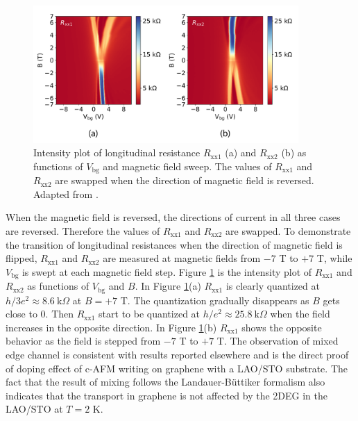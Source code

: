\documentclass[pdflatex, sectionletters, 12pt, final, phd]{pittetd}    %
\begin{document}
\begin{figure}[h!]
	\centering
	\includegraphics[width=0.90\textwidth]{Drawing/MixingIntensityPlot.pdf}
	\caption[Intensity plot of longitudinal resistances]{Intensity plot of longitudinal resistance $R_\mathrm{xx1}$ (a) and $R_\mathrm{xx2}$ (b) as functions of $V_\mathrm{bg}$ and magnetic field sweep. The values of $R_\mathrm{xx1}$ and $R_\mathrm{xx2}$ are swapped when the direction of magnetic field is reversed. Adapted from \cite{li2019reconfigurable}.}
	\label{FIG:MixingIntensityPlot}
\end{figure}

When the magnetic field is reversed, the directions of current in all three cases are reversed. Therefore the values of $R_\mathrm{xx1}$ and $R_\mathrm{xx2}$ are swapped. To demonstrate the transition of longitudinal resistances when the direction of magnetic field is flipped, $R_\mathrm{xx1}$ and $R_\mathrm{xx2}$ are measured at magnetic fields from $-7$ T to $+7$ T, while $V_\mathrm{bg}$ is swept at each magnetic field step. Figure \ref{FIG:MixingIntensityPlot} is the intensity plot of $R_\mathrm{xx1}$ and $R_\mathrm{xx2}$ as functions of $V_\mathrm{bg}$ and $B$. In Figure \ref{FIG:MixingIntensityPlot}(a) $R_\mathrm{xx1}$ is clearly quantized at $h/3e^2 \approx 8.6 \ \mathrm{k}\Omega$ at $B = +7$ T. The quantization gradually disappears as $B$ gets close to 0. Then $R_\mathrm{xx1}$ start to be quantized at $h/e^2 \approx 25.8 \ \mathrm{k}\Omega$ when the field increases in the opposite direction. In Figure \ref{FIG:MixingIntensityPlot}(b) $R_\mathrm{xx1}$ shows the opposite behavior as the field is stepped from $-7$ T to $+7$ T. The observation of mixed edge channel is consistent with results reported elsewhere\cite{williams2007quantum, lohmann2009four, amet2014selective, abanin2007quantized, ki2010dependence, klimov2015edge, woszczyna2011graphene, ozyilmaz2007electronic, schmidt2013mixing} and is the direct proof of doping effect of c-AFM writing on graphene with a LAO/STO substrate. The fact that the result of mixing follows the Landauer-B{\"u}ttiker formalism also indicates that the transport in graphene is not affected by the 2DEG in the LAO/STO at $T = 2$ K.
\end{document}
